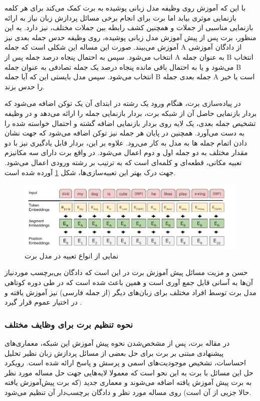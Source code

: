 با این که آموزش روی وظیفه مدل زبانی پوشیده به برت کمک می‌کند برای هر کلمه بازنمایی موثری بیابد اما برت برای انجام برخی مسائل پردازش زبان نیاز به ارائه بازنمایی مناسبی از جملات
و همچنین کشف رابطه بین جملات مختلف،
 نیز دارد. به این منظور، برت پس از پیش آموزش مدل زبانی پوشیده، روی وظیفه حدس جمله بعدی نیز آموزش می‌بیند. صورت این مساله این شکلی است که جمله A از دادگان آموزشی انتخاب می‌شود. سپس به احتمال پنجاه درصد جمله پس از A به عنوان جمله B انتخاب می‌شود و یا به احتمال باقی مانده پنجاه درصد یک جمله تصادفی به عنوان جمله B انتخاب می‌شود. سپس مدل بایستی این که آیا جمله B جمله بعدی جمله A است یا خیر را حدس بزند. 

 در پیاده‌سازی برت، هنگام ورود یک رشته در ابتدای آن یک توکن
\lr{[CLS]}
اضافه می‌شود که بردار بازنمایی حاصل آن از شبکه برت، بردار بازنمایی جمله را ارائه می‌دهد و در وظیفه تشخیص جمله بعدی، یک لایه
روی بردار بازنمایی
\lr{[CLS]}
اضافه گشته و احتمال خواسته شده را به دست می‌آورد. همچنین در پایان هر جمله نیز توکن
\lr{[SEP]}
اضافه می‌شود که جهت نشان دادن اتمام جمله ها به مدل به کار می‌رود. علاوه بر این، بردار
قابل یادگیری نیز با دو مقدار مختلف به دو جمله اول و دوم اعمال می‌شود. در واقع برت دارای سه مکانیزم تعبیه مکانی، قطعه‌ای و کلمه‌ای است که به ترتیب بر رشته ورودی اعمال می‌شود. جهت درک بهتر این تعبیه‌سازی‌ها، شکل
\ref{fig:chap3:bert_embeddings}
 آورده شده است.

 \begin{figure}[h]
 	\centering
 	\includegraphics[width=1\textwidth]{images/chap3/bert_embeddings.png}
 	\caption[نمایی از انواع تعبیه در مدل برت]
 	{
 		نمایی از انواع تعبیه در مدل برت
 		\cite{bert}
 	}
 	\label{fig:chap3:bert_embeddings}
 \end{figure}

حسن و مزیت مسائل پیش آموزش برت در این است که دادگان بی‌برچسب موردنیاز آن‌ها به آسانی قابل جمع آوری است و همین باعث شده است که در طی دوره کوتاهی مدل برت 
توسط افراد مختلف
برای زبان‌های دیگر (از جمله فارسی) نیز آموزش یافته و در اختیار عموم قرار گیرد
\cite{parsbert}.

\subsubsection{نحوه تنظیم برت برای وظایف مختلف}
در مقاله برت،‌ پس از مشخص‌شدن نحوه پیش آموزش این شبکه، معماری‌های پیشنهادی مبتنی بر برت برای حل بعضی از مسائل پردازش زبان نظیر تحلیل احساسات، تشخیص موجودیت‌های اسمی و پرسش و پاسخ ارائه شده است. رویکرد حل این مسائل با برت به این نحو است که معمولا لایه‌هایی جهت حل مساله مورد نظر به برت پیش آموزش یافته اضافه می‌شوند و معماری جدید (که برت پیش‌آموزش یافته حالا جزیی از آن است) روی مساله مورد نظر و دادگان برچسب‌دار آن تنظیم می‌شود. 

